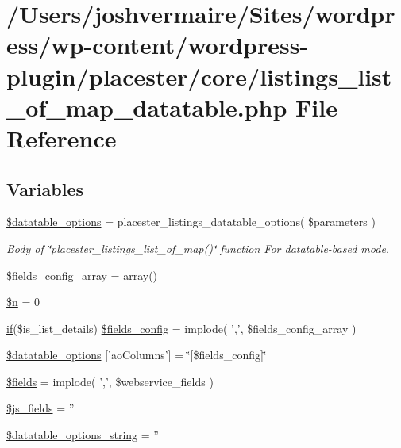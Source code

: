 \hypertarget{listings__list__of__map__datatable_8php}{
\section{/Users/joshvermaire/Sites/wordpress/wp-\/content/wordpress-\/plugin/placester/core/listings\_\-list\_\-of\_\-map\_\-datatable.php File Reference}
\label{d2/dd4/listings__list__of__map__datatable_8php}
}
\subsection*{Variables}
\begin{DoxyCompactItemize}
\item 
\hyperlink{listings__list__of__map__datatable_8php_ac481557faa1530c1ca3c5230aa250ca5}{\$datatable\_\-options} = placester\_\-listings\_\-datatable\_\-options( \$parameters )
\begin{DoxyCompactList}\small\item\em Body of \char`\"{}placester\_\-listings\_\-list\_\-of\_\-map()\char`\"{} function For datatable-\/based mode. \end{DoxyCompactList}\item 
\hyperlink{listings__list__of__map__datatable_8php_aa926f565091fd4c2f4a25c17587a051d}{\$fields\_\-config\_\-array} = array()
\item 
\hyperlink{listings__list__of__map__datatable_8php_aa5fae90470d460a65d5211ec08e6b05c}{\$n} = 0
\item 
\hyperlink{listings__list__lone__divbased_8php_a0b49fff73af3a13232913ea65ca484d9}{if}(\$is\_\-list\_\-details) \hyperlink{listings__list__of__map__datatable_8php_a77af8dccdce0340eb04c395345c0a012}{\$fields\_\-config} = implode( ',', \$fields\_\-config\_\-array )
\item 
\hyperlink{listings__list__of__map__datatable_8php_a2022ba2609adb229b6169ded377ff005}{\$datatable\_\-options} \mbox{[}'aoColumns'\mbox{]} = \char`\"{}\mbox{[}\$fields\_\-config\mbox{]}\char`\"{}
\item 
\hyperlink{listings__list__of__map__datatable_8php_ab2303c817e3b402b77b7f99627b9c319}{\$fields} = implode( ',', \$webservice\_\-fields )
\item 
\hyperlink{listings__list__of__map__datatable_8php_a5791c25b4c32e8c7d1fc32a39a328a7e}{\$js\_\-fields} = ''
\item 
\hyperlink{listings__list__of__map__datatable_8php_ab74772b3fc544c34f500c3e0d8fd627e}{\$datatable\_\-options\_\-string} = ''
\end{DoxyCompactItemize}


